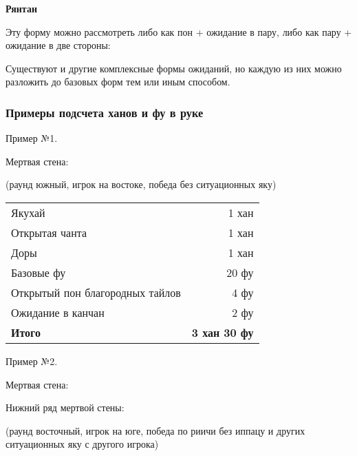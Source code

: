\begin{additional}
\vspace{0.3cm}
\textbf{Рянтан}
\vspace{0.3cm}

\vspace{0.3cm}

Эту форму можно рассмотреть либо как пон + ожидание в пару, либо как пару + ожидание в две стороны:

\vspace{0.3cm}

\vspace{0.3cm}

\vspace{0.3cm}

Существуют и другие комплексные формы ожиданий, но каждую из них можно разложить до базовых форм тем или иным способом.

\end{additional}

\subsubsection{Примеры подсчета ханов и фу в руке}

Пример №1.

\hfill {}

Мертвая стена:

(раунд южный, игрок на востоке, победа без ситуационных яку)

\noindent\begin{tabular}{lr}
	Якухай & 1 хан \\
	Открытая чанта & 1 хан \\
	Доры & 1 хан \\
	Базовые фу & 20 фу \\
	Открытый пон благородных тайлов & 4 фу \\
	Ожидание в канчан & 2 фу \\
	\midrule
	\textbf{Итого} & \textbf{3 хан 30 фу} \\
\end{tabular}

Пример №2.

 \hfill {}

Мертвая стена: 

Нижний ряд мертвой стены: 

(раунд восточный, игрок на юге, победа по риичи без иппацу и других ситуационных яку с другого игрока)

